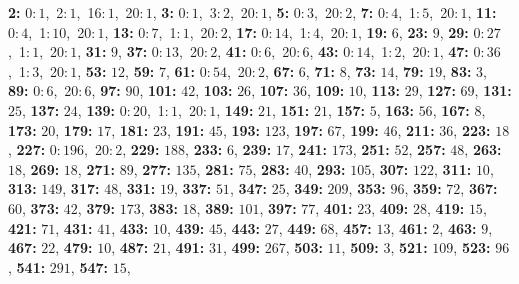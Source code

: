 \textsf{\bfseries 2:} 0:\,$1$,\ 2:\,$1$,\ 16:\,$1$,\ 20:\,$1$, \textsf{\bfseries 3:} 0:\,$1$,\ 3:\,$2$,\ 20:\,$1$, \textsf{\bfseries 5:} 0:\,$3$,\ 20:\,$2$, \textsf{\bfseries 7:} 0:\,$4$,\ 1:\,$5$,\ 20:\,$1$, \textsf{\bfseries 11:} 0:\,$4$,\ 1:\,$10$,\ 20:\,$1$, \textsf{\bfseries 13:} 0:\,$7$,\ 1:\,$1$,\ 20:\,$2$, \textsf{\bfseries 17:} 0:\,$14$,\ 1:\,$4$,\ 20:\,$1$, \textsf{\bfseries 19:} $6$, \textsf{\bfseries 23:} $9$, \textsf{\bfseries 29:} 0:\,$27$,\ 1:\,$1$,\ 20:\,$1$, \textsf{\bfseries 31:} $9$, \textsf{\bfseries 37:} 0:\,$13$,\ 20:\,$2$, \textsf{\bfseries 41:} 0:\,$6$,\ 20:\,$6$, \textsf{\bfseries 43:} 0:\,$14$,\ 1:\,$2$,\ 20:\,$1$, \textsf{\bfseries 47:} 0:\,$36$,\ 1:\,$3$,\ 20:\,$1$, \textsf{\bfseries 53:} $12$, \textsf{\bfseries 59:} $7$, \textsf{\bfseries 61:} 0:\,$54$,\ 20:\,$2$, \textsf{\bfseries 67:} $6$, \textsf{\bfseries 71:} $8$, \textsf{\bfseries 73:} $14$, \textsf{\bfseries 79:} $19$, \textsf{\bfseries 83:} $3$, \textsf{\bfseries 89:} 0:\,$6$,\ 20:\,$6$, \textsf{\bfseries 97:} $90$, \textsf{\bfseries 101:} $42$, \textsf{\bfseries 103:} $26$, \textsf{\bfseries 107:} $36$, \textsf{\bfseries 109:} $10$, \textsf{\bfseries 113:} $29$, \textsf{\bfseries 127:} $69$, \textsf{\bfseries 131:} $25$, \textsf{\bfseries 137:} $24$, \textsf{\bfseries 139:} 0:\,$20$,\ 1:\,$1$,\ 20:\,$1$, \textsf{\bfseries 149:} $21$, \textsf{\bfseries 151:} $21$, \textsf{\bfseries 157:} $5$, \textsf{\bfseries 163:} $56$, \textsf{\bfseries 167:} $8$, \textsf{\bfseries 173:} $20$, \textsf{\bfseries 179:} $17$, \textsf{\bfseries 181:} $23$, \textsf{\bfseries 191:} $45$, \textsf{\bfseries 193:} $123$, \textsf{\bfseries 197:} $67$, \textsf{\bfseries 199:} $46$, \textsf{\bfseries 211:} $36$, \textsf{\bfseries 223:} $18$, \textsf{\bfseries 227:} 0:\,$196$,\ 20:\,$2$, \textsf{\bfseries 229:} $188$, \textsf{\bfseries 233:} $6$, \textsf{\bfseries 239:} $17$, \textsf{\bfseries 241:} $173$, \textsf{\bfseries 251:} $52$, \textsf{\bfseries 257:} $48$, \textsf{\bfseries 263:} $18$, \textsf{\bfseries 269:} $18$, \textsf{\bfseries 271:} $89$, \textsf{\bfseries 277:} $135$, \textsf{\bfseries 281:} $75$, \textsf{\bfseries 283:} $40$, \textsf{\bfseries 293:} $105$, \textsf{\bfseries 307:} $122$, \textsf{\bfseries 311:} $10$, \textsf{\bfseries 313:} $149$, \textsf{\bfseries 317:} $48$, \textsf{\bfseries 331:} $19$, \textsf{\bfseries 337:} $51$, \textsf{\bfseries 347:} $25$, \textsf{\bfseries 349:} $209$, \textsf{\bfseries 353:} $96$, \textsf{\bfseries 359:} $72$, \textsf{\bfseries 367:} $60$, \textsf{\bfseries 373:} $42$, \textsf{\bfseries 379:} $173$, \textsf{\bfseries 383:} $18$, \textsf{\bfseries 389:} $101$, \textsf{\bfseries 397:} $77$, \textsf{\bfseries 401:} $23$, \textsf{\bfseries 409:} $28$, \textsf{\bfseries 419:} $15$, \textsf{\bfseries 421:} $71$, \textsf{\bfseries 431:} $41$, \textsf{\bfseries 433:} $10$, \textsf{\bfseries 439:} $45$, \textsf{\bfseries 443:} $27$, \textsf{\bfseries 449:} $68$, \textsf{\bfseries 457:} $13$, \textsf{\bfseries 461:} $2$, \textsf{\bfseries 463:} $9$, \textsf{\bfseries 467:} $22$, \textsf{\bfseries 479:} $10$, \textsf{\bfseries 487:} $21$, \textsf{\bfseries 491:} $31$, \textsf{\bfseries 499:} $267$, \textsf{\bfseries 503:} $11$, \textsf{\bfseries 509:} $3$, \textsf{\bfseries 521:} $109$, \textsf{\bfseries 523:} $96$, \textsf{\bfseries 541:} $291$, \textsf{\bfseries 547:} $15$, 
